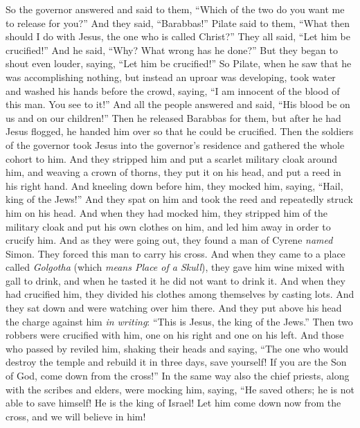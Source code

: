 \begin{biblechapter}
\verse So the governor answered and said to them, “Which of the two do you want me to release for you?” And they said, “Barabbas!”
\verse Pilate said to them, “What then should I do with Jesus, the one who is called Christ?” They all said, “Let him be crucified!”
\verse And he said, “Why? What wrong has he done?” But they began to shout even louder, saying, “Let him be crucified!”
\verse So Pilate, when he saw that he was accomplishing nothing, but instead an uproar was developing, took water and washed his hands before the crowd, saying, “I am innocent of the blood of this man. You see to it!”
\verse And all the people answered and said, “His blood be on us and on our children!”
\verse Then he released Barabbas for them, but after he had Jesus flogged, he handed him over so that he could be crucified.
 Then the soldiers of the governor took Jesus into the governor’s residence and gathered the whole cohort to him.
\verse And they stripped him and put a scarlet military cloak around him,
\verse and weaving a crown of thorns, they put it on his head, and put a reed in his right hand. And kneeling down before him, they mocked him, saying, “Hail, king of the Jews!”
\verse And they spat on him and took the reed and repeatedly struck him on his head.
\verse And when they had mocked him, they stripped him of the military cloak and put his own clothes on him, and led him away in order to crucify him.
 And as they were going out, they found a man of Cyrene \textit{named} Simon. They forced this man to carry his cross.
\verse And when they came to a place called \textit{Golgotha} (which \textit{means Place of a Skull}),
\verse they gave him wine mixed with gall to drink, and when he tasted it he did not want to drink it.
\verse And when they had crucified him, they divided his clothes among themselves by casting lots.
\verse And they sat down and were watching over him there.
\verse And they put above his head the charge against him \textit{in writing}: “This is Jesus, the king of the Jews.”
\verse Then two robbers were crucified with him, one on his right and one on his left.
\verse And those who passed by reviled him, shaking their heads
\verse and saying, “The one who would destroy the temple and rebuild it in three days, save yourself! If you are the Son of God, come down from the cross!”
\verse In the same way also the chief priests, along with the scribes and elders, were mocking him, saying,
\verse “He saved others; he is not able to save himself! He is the king of Israel! Let him come down now from the cross, and we will believe in him!

\end{biblechapter}
